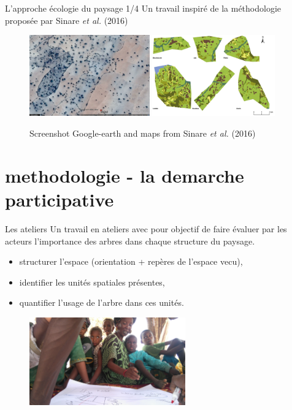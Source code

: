 \documentclass[newPxFont]{beamer}
\begin{document}
\begin{frame}[c]{L'approche écologie du paysage 1/4}
\vspace{-1cm}
Un travail inspiré de la méthodologie proposée par Sinare \textit{et al.} (2016)
\begin{figure}
	\centering
	\includegraphics[height = 3.5cm]{img/ggearth}
  \includegraphics[height = 3.5cm]{img/Sinare_et_al2016}
  \caption{\small{Screenshot Google-earth and maps from Sinare \textit{et al.} (2016)}}
\end{figure}
\end{frame}

\section{methodologie - la demarche participative}
\begin{frame}[c]{Les ateliers}
\vspace{-1cm}
Un travail en ateliers avec pour objectif de faire évaluer par les acteurs l'importance des arbres dans chaque structure du paysage.
\begin{itemize}
  \item structurer l'espace (orientation + repères de l'espace vecu),
  \item identifier les unités spatiales présentes,
  \item quantifier l'usage de l'arbre dans ces unités.
\end{itemize}
\begin{figure}
	\centering
	\includegraphics[width = 0.6\textwidth,angle=180]{img/DSC_1789}
\end{figure}
\end{frame}
\end{document}
